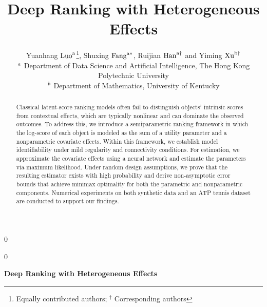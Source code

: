 \documentclass[
  12pt]{article}
\newcommand{\anon}{0}
\begin{document}

\def\spacingset#1{\renewcommand{\baselinestretch}%
{#1}\small\normalsize} \spacingset{1}




\anon
{
  \title{\bf Deep Ranking with Heterogeneous Effects}
  \author{Yuanhang $\rm{Luo}^{a}$\thanks{Equally contributed authors; ${}^{\dagger}$ Corresponding authors},\hspace{0.2cm}
		Shuxing $\rm{Fang}^{a*}$,\hspace{0.2cm}
		Ruijian $\rm{Han}^{a\dagger}$\hspace{0.2cm} and
		Yiming $\rm{Xu}^{b\dagger}$
		\\
		{\small {\small {$\it^{a}$  Department of Data Science and Artificial Intelligence, The Hong Kong Polytechnic University  } }}\\
		{\small {\small {$\it^{b}$ Department of Mathematics, University of Kentucky} }}
	}
  \maketitle
} \fi

\anon
{
  \bigskip
  \bigskip
  \bigskip
  \begin{center}
    {\LARGE\bf Deep Ranking with Heterogeneous Effects}
\end{center}
  \medskip
} \fi

\bigskip
\begin{abstract}
Classical latent-score ranking models often fail to distinguish objects' intrinsic scores from contextual effects, which are typically nonlinear and can dominate the observed outcomes. To address this, we introduce a semiparametric ranking framework in which the log-score of each object is modeled as the sum of a utility parameter and a nonparametric covariate effects. Within this framework, we establish model identifiability under mild regularity and connectivity conditions. For estimation, we approximate the covariate effects using a neural network and estimate the parameters via maximum likelihood. Under random design assumptions, we prove that the resulting estimator exists with high probability and derive non-asymptotic error bounds that achieve minimax optimality for both the parametric and nonparametric components. Numerical experiments on both synthetic data and an ATP tennis dataset are conducted to support our findings.
\end{abstract}
\end{document}
